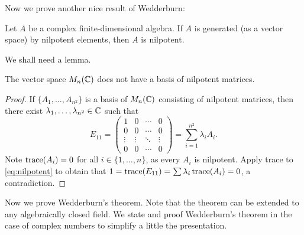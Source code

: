Now we prove another nice result of Wedderburn:

\begin{theorem}[Wedderburn]
\label{thm:Wedderburn}
    Let $A$ be a complex finite-dimensional 
    algebra. If $A$ is generated (as a vector space) 
    by nilpotent elements, then $A$ is nilpotent. 
\end{theorem}

We shall need a lemma.

\begin{lemma}
    The vector space $M_n(\mathbb{C})$ does not have a basis of nilpotent matrices. 
\end{lemma}

\begin{proof}
    If $\{A_1,\dots,A_{n^2}\}$ is a basis of 
    $M_n(\mathbb{C})$ consisting of nilpotent matrices, 
    then there exist $\lambda_1,\dots,\lambda_{n^2}\in\mathbb{C}$ such that 
    \begin{equation}
        \label{eq:nilpotent}
        E_{11}=\begin{pmatrix}
        1&0&\cdots&0\\
        0&0&\cdots&0\\
        \vdots&\vdots&\ddots&\vdots\\
        0&0&\cdots&0
        \end{pmatrix}
        =\sum_{i=1}^{n^2}\lambda_iA_i.
    \end{equation}
    Note $\operatorname{trace}(A_i)=0$ for all $i\in\{1,\dots,n\}$, as 
    every $A_i$ is nilpotent. 
    Apply trace to \eqref{eq:nilpotent} to 
    obtain that $1=\operatorname{trace}(E_{11})=\sum\lambda_i\operatorname{trace}(A_i)=0$, a contradiction. 
\end{proof}

Now we prove Wedderburn's theorem. Note that
the theorem can be extended to any algebraically closed field. We 
state and proof Wedderburn's theorem in the case of complex numbers
to simplify a little the presentation. 


